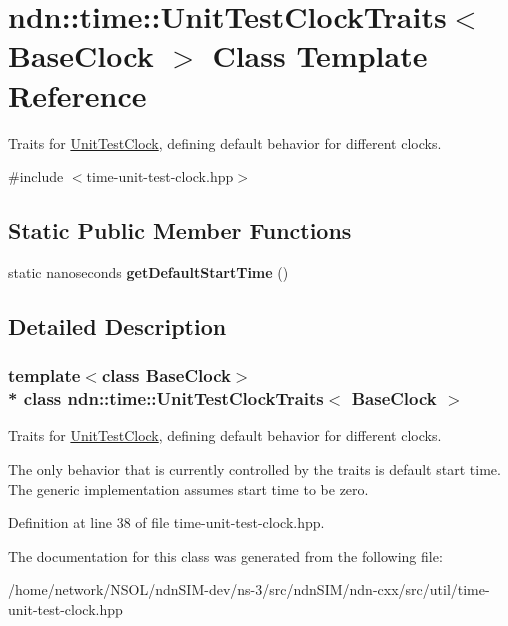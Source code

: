 \hypertarget{classndn_1_1time_1_1UnitTestClockTraits}{}\section{ndn\+:\+:time\+:\+:Unit\+Test\+Clock\+Traits$<$ Base\+Clock $>$ Class Template Reference}
\label{classndn_1_1time_1_1UnitTestClockTraits}


Traits for \hyperlink{classndn_1_1time_1_1UnitTestClock}{Unit\+Test\+Clock}, defining default behavior for different clocks.  




{\ttfamily \#include $<$time-\/unit-\/test-\/clock.\+hpp$>$}

\subsection*{Static Public Member Functions}
\begin{DoxyCompactItemize}
\item 
static nanoseconds {\bfseries get\+Default\+Start\+Time} ()\hypertarget{classndn_1_1time_1_1UnitTestClockTraits_a2cf72a0966f84aa83d29ddd34ec111f6}{}\label{classndn_1_1time_1_1UnitTestClockTraits_a2cf72a0966f84aa83d29ddd34ec111f6}

\end{DoxyCompactItemize}


\subsection{Detailed Description}
\subsubsection*{template$<$class Base\+Clock$>$\\*
class ndn\+::time\+::\+Unit\+Test\+Clock\+Traits$<$ Base\+Clock $>$}

Traits for \hyperlink{classndn_1_1time_1_1UnitTestClock}{Unit\+Test\+Clock}, defining default behavior for different clocks. 

The only behavior that is currently controlled by the traits is default start time. The generic implementation assumes start time to be zero. 

Definition at line 38 of file time-\/unit-\/test-\/clock.\+hpp.



The documentation for this class was generated from the following file\+:\begin{DoxyCompactItemize}
\item 
/home/network/\+N\+S\+O\+L/ndn\+S\+I\+M-\/dev/ns-\/3/src/ndn\+S\+I\+M/ndn-\/cxx/src/util/time-\/unit-\/test-\/clock.\+hpp\end{DoxyCompactItemize}
